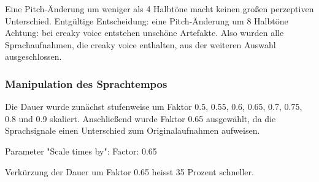 \documentclass[11pt,a4paper,headsepline,twoside,toc=bibliography]{scrreprt}
\begin{document}
Eine Pitch-Änderung um weniger als 4 Halbtöne macht keinen großen perzeptiven Unterschied. 
Entgültige Entscheidung: eine Pitch-Änderung um 8 Halbtöne \\

Achtung: bei creaky voice entstehen unschöne Artefakte. Also wurden alle Sprachaufnahmen, die creaky voice enthalten, aus der weiteren Auswahl ausgeschlossen.

\subsubsection{Manipulation des Sprachtempos}
\label{sec:tempo}

Die Dauer wurde zunächst stufenweise um Faktor 0.5, 0.55, 0.6, 0.65, 0.7, 0.75, 0.8 und 0.9 skaliert. Anschließend wurde Faktor 0.65 ausgewählt, da die Sprachsignale einen Unterschied zum Originalaufnahmen aufweisen.

Parameter "Scale times by":
Factor: 0.65

Verkürzung der Dauer um Faktor 0.65 heisst 35 Prozent schneller.
\end{document}
